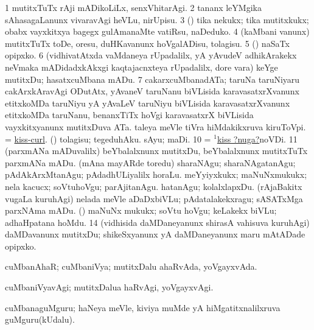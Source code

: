 \noindent
\gl{\nuga}
\bmng
\bnum
\num{1}  mutitxTuTx rAji mADikoLiLx, senxVhitarAgi. 
\num{2}  tananx leYMgika sAhasagaLanunx vivaravAgi heVLu, nirUpisu. 
\num{3}  (\ashi) tika nekukx; tika mutitxkukx; obabx vayxkitxya bagegx gulAmanaMte vatiRsu, naDeduko. 
\num{4}  (kaMbani \mo vanunx) mutitxTuTx toDe, oresu, duHKavanunx hoVgalADisu, tolagisu. 
\num{5}  (\AmA) naSaTx opipxko. 
\num{6}  (vidhivatAtxda vaMdaneya rUpadalilx, yA yAvudeV adhikArakekx neVmaka mADidadxkAkxgi kaqtajacnxteya rUpadalilx, dore \mo vara) keYge mutitxDu; hasatxcuMbana mADu. 
\num{7}  cakarxcuMbanadATa; taruNa taruNiyaru cakArxkAravAgi ODutAtx, yAvaneV taruNanu biVLisida karavasatxrXvanunx etitxkoMDa taruNiyu yA yAvaLeV taruNiyu biVLisida karavasatxrXvanunx etitxkoMDa taruNanu, benanxTiTx hoVgi karavasatxrX biVLisida vayxkitxyanunx mutitxDuva ATa. 
  
\banum
{} taleya meVle tiVra hiMdakikxruva kiruToVpi. 
 = \hyperlink{kiss-curl}{kiss-curl}. 
\eanum
\numie
{}  (\ashi) 
\banum
{} tolagisu; tegeduhAku. 
 sAyu; maDi. 
\eanum
\numie
\num{10}  = \hyperlink{kiss(1)nuga}{$^1$kiss ?nuga?}noVDi. 
\num{11}  (parxmANa mADuvalilx) beYbalalxnunx mutitxDu, beYbalalxnunx mutitxTuTx parxmANa mADu. 
  
\banum
{} (mAna mayARde toredu) sharaNAgu; sharaNAgatanAgu; pAdAkArxMtanAgu; pAdadhULiyalilx horaLu. 
 meYyiyxkukx; maNuNxmukukx; nela kacucx; soVtuhoVgu; parAjitanAgu. 
 hatanAgu; kolalxlapxDu. 
\eanum
\numie
{}  
\banum
{} (rAjaBakitx \mo vugaLa kuruhAgi) nelada meVle aDaDxbiVLu; pAdatalakekxragu; sASATxMga parxNAma mADu. 
 (\rUpa) maNuNx mukukx; soVtu hoVgu; keLakekx biVLu; adhaHpatana hoMdu. 
\eanum
\numie
\num{14}  (vidhisida daMDaneyanunx shirasA vahisuva kuruhAgi) daMDavanunx mutitxDu; shikeSxyanunx yA daMDaneyanunx maru mAtADade opipxko. 
\enum
\emng
\eentry

\bentry
{}
\gl{\gu}
\bmng
cuMbanAhaR; cuMbaniVya; mutitxDalu ahaRvAda, yoVgayxvAda. 
\emng
\eentry

\bentry
{}
\gl{\kirxvi}
\bmng
cuMbaniVyavAgi; mutitxDalua haRvAgi, yoVgayxvAgi. 
\emng
\eentry

\bentry
{}
\gl{\nA}
\bmng
cuMbanaguMguru; haNeya meVle, kiviya muMde yA hiMgatitxnalilxruva guMguru(kUdalu). 
\emng
\eentry

